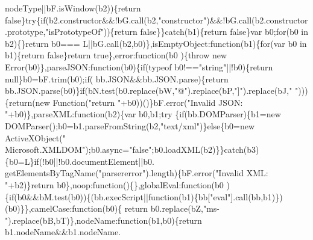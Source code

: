 \begin{DoxyCode}
      nodeType||bF.isWindow(b2))\{\textcolor{keywordflow}{return} \textcolor{keyword}{false}\}\textcolor{keywordflow}{try}\{\textcolor{keywordflow}{if}(b2.constructor&&!bG.call(b2,\textcolor{stringliteral}{"constructor"})&&!bG.call(b2.constructor
      .prototype,\textcolor{stringliteral}{"isPrototypeOf"}))\{\textcolor{keywordflow}{return} \textcolor{keyword}{false}\}\}\textcolor{keywordflow}{catch}(b1)\{\textcolor{keywordflow}{return} \textcolor{keyword}{false}\}var b0;\textcolor{keywordflow}{for}(b0 in b2)\{\}\textcolor{keywordflow}{return} b0===
      L||bG.call(b2,b0)\},isEmptyObject:\textcolor{keyword}{function}(b1)\{\textcolor{keywordflow}{for}(var b0 in b1)\{\textcolor{keywordflow}{return} \textcolor{keyword}{false}\}\textcolor{keywordflow}{return} \textcolor{keyword}{true}\},error:\textcolor{keyword}{function}(b0
      )\{\textcolor{keywordflow}{throw} \textcolor{keyword}{new} Error(b0)\},parseJSON:\textcolor{keyword}{function}(b0)\{\textcolor{keywordflow}{if}(typeof b0!==\textcolor{stringliteral}{"string"}||!b0)\{\textcolor{keywordflow}{return} null\}b0=bF.trim(b0);\textcolor{keywordflow}{if}(
      bb.JSON&&bb.JSON.parse)\{\textcolor{keywordflow}{return} bb.JSON.parse(b0)\}\textcolor{keywordflow}{if}(bN.test(b0.replace(bW,\textcolor{stringliteral}{"@"}).replace(bP,\textcolor{stringliteral}{"]"}).replace(bJ,\textcolor{stringliteral}{"
      "})))\{\textcolor{keywordflow}{return}(\textcolor{keyword}{new} Function(\textcolor{stringliteral}{"return "}+b0))()\}bF.error(\textcolor{stringliteral}{"Invalid JSON: "}+b0)\},parseXML:\textcolor{keyword}{function}(b2)\{var b0,b1;\textcolor{keywordflow}{try}
      \{\textcolor{keywordflow}{if}(bb.DOMParser)\{b1=\textcolor{keyword}{new} DOMParser();b0=b1.parseFromString(b2,\textcolor{stringliteral}{"text/xml"})\}\textcolor{keywordflow}{else}\{b0=\textcolor{keyword}{new} ActiveXObject(\textcolor{stringliteral}{"
      Microsoft.XMLDOM"});b0.async=\textcolor{stringliteral}{"false"};b0.loadXML(b2)\}\}\textcolor{keywordflow}{catch}(b3)\{b0=L\}\textcolor{keywordflow}{if}(!b0||!b0.documentElement||b0.
      getElementsByTagName(\textcolor{stringliteral}{"parsererror"}).length)\{bF.error(\textcolor{stringliteral}{"Invalid XML: "}+b2)\}\textcolor{keywordflow}{return} b0\},noop:\textcolor{keyword}{function}()\{\},globalEval:\textcolor{keyword}{function}(b0
      )\{\textcolor{keywordflow}{if}(b0&&bM.test(b0))\{(bb.execScript||\textcolor{keyword}{function}(b1)\{bb[\textcolor{stringliteral}{"eval"}].call(bb,b1)\})(b0)\}\},camelCase:\textcolor{keyword}{function}(b0)\{\textcolor{keywordflow}{
      return} b0.replace(bZ,\textcolor{stringliteral}{"ms-"}).replace(bB,bT)\},nodeName:\textcolor{keyword}{function}(b1,b0)\{\textcolor{keywordflow}{return} b1.nodeName&&b1.nodeName.

\end{DoxyCode}
